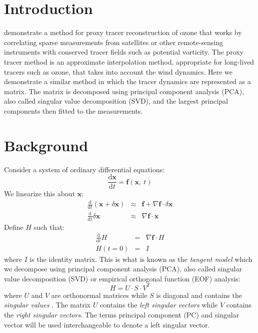 
\newcommand{\vect}[1]{\ensuremath{\boldsymbol #1}}

\section{Introduction}

\citet{Randall_etal2002} demonstrate a method for proxy tracer reconstruction 
of ozone that works by correlating sparse measurements from satellites or
other remote-sensing instruments with conserved 
tracer fields such as potential vorticity.
The proxy tracer method is an approximate interpolation method, appropriate for
 long-lived tracers such as ozone, that takes into account the wind
dynamics.
Here we demonstrate a similar method in which the tracer dynamics are
represented as a matrix.
The matrix is decomposed using principal component analysis (PCA),
also called singular value decomposition (SVD), and the largest 
principal components then fitted to the measurements.

\section{Background}

Consider a system of ordinary differential equations:
\begin{equation}
\frac{\mathrm d \vect x}{\mathrm d t} = \vect f(\vect x,~t)
\end{equation}
We linearize this about $\vect x$:
\begin{eqnarray}
\frac{\mathrm d}{\mathrm d t} (\vect x + \delta \vect x) & \approx & \vect f + 
		\nabla \vect f \cdot \delta \vect x \\
\frac{\mathrm d}{\mathrm d t} \delta \vect x & \approx & \nabla \vect f \cdot \vect x
\end{eqnarray}
Define $H$ such that:
\begin{eqnarray} 
\frac{\mathrm d}{\mathrm d t} H & = & \nabla \vect f \cdot H \\
H (t=0) & = & I
\end{eqnarray}
where $I$ is the identity matrix.
This is what is known as the \textit{tangent model} which we 
decompose using principal component analysis (PCA), also called singular
value decomposition (SVD) or empirical orthogonal function (EOF) analysis:
\begin{equation}
H  =  U \cdot S \cdot V^T
\end{equation}
where $U$ and $V$ are orthonormal matrices while $S$ is diagonal and contains
the \textit{singular values} \citep{Press_etal1992}.
The matrix $U$ contains the \textit{left singular vectors} 
while $V$ contains the \textit{right singular vectors}.
The terms principal component (PC) and singular vector will be used
interchangeable to denote a left singular vector.

